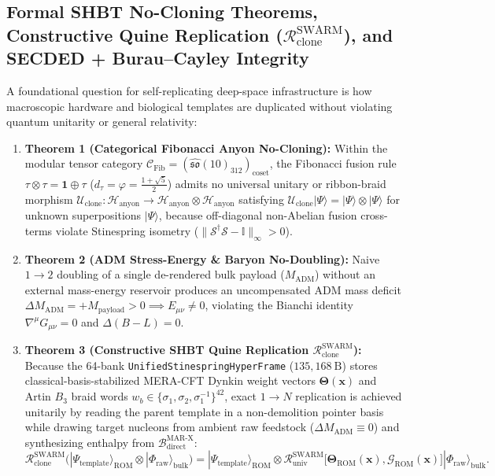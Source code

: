 \documentclass[11pt,onecolumn]{article}
\begin{document}
\FloatBarrier
\subsection[Formal SHBT No-Cloning Theorems and Constructive Quine Replication]{Formal SHBT No-Cloning Theorems, Constructive Quine Replication (\texorpdfstring{$\mathcal{R}_{\text{clone}}^{\text{SWARM}}$}{R(clone)}), and SECDED + Burau--Cayley Integrity}
\label{subsec:quine_cloning}
A foundational question for self-replicating deep-space infrastructure is how macroscopic hardware and biological templates are duplicated without violating quantum unitarity or general relativity:
\begin{enumerate}
    \item \textbf{Theorem 1 (Categorical Fibonacci Anyon No-Cloning):} Within the modular tensor category $\mathcal{C}_{\text{Fib}} = (\widehat{\mathfrak{so}}(10)_{312})_{\text{coset}}$, the Fibonacci fusion rule $\tau \otimes \tau = \mathbf{1} \oplus \tau$ ($d_\tau = \varphi = \frac{1+\sqrt{5}}{2}$) admits no universal unitary or ribbon-braid morphism $\mathcal{U}_{\text{clone}} : \mathcal{H}_{\text{anyon}} \to \mathcal{H}_{\text{anyon}} \otimes \mathcal{H}_{\text{anyon}}$ satisfying $\mathcal{U}_{\text{clone}}|\Psi\rangle = |\Psi\rangle \otimes |\Psi\rangle$ for unknown superpositions $|\Psi\rangle$, because off-diagonal non-Abelian fusion cross-terms violate Stinespring isometry ($\|\mathcal{S}^\dagger\mathcal{S} - \mathbb{I}\|_\infty > 0$).
    \item \textbf{Theorem 2 (ADM Stress-Energy \& Baryon No-Doubling):} Naive $1 \to 2$ doubling of a single de-rendered bulk payload ($M_{\text{ADM}}$) without an external mass-energy reservoir produces an uncompensated ADM mass deficit $\Delta M_{\text{ADM}} = +M_{\text{payload}} > 0 \implies E_{\mu\nu} \neq 0$, violating the Bianchi identity $\nabla^\mu G_{\mu\nu} = 0$ and $\Delta(B-L) = 0$.
    \item \textbf{Theorem 3 (Constructive SHBT Quine Replication $\mathcal{R}_{\text{clone}}^{\text{SWARM}}$):} Because the 64-bank \texttt{UnifiedStinespringHyperFrame} ($135{,}168~\text{B}$) stores classical-basis-stabilized MERA-CFT Dynkin weight vectors $\bm{\Theta}(\mathbf{x})$ and Artin $B_3$ braid words $w_b \in \{\sigma_1, \sigma_2, \sigma_1^{-1}\}^{42}$, exact $1 \to N$ replication is achieved unitarily by reading the parent template in a non-demolition pointer basis while drawing target nucleons from ambient raw feedstock ($\Delta M_{\text{ADM}} \equiv 0$) and synthesizing enthalpy from $\mathcal{B}_{\text{direct}}^{\text{MAR-X}}$:
    \begin{equation}
    \mathcal{R}_{\text{clone}}^{\text{SWARM}}\Big(|\Psi_{\text{template}}\rangle_{\text{ROM}} \otimes |\Phi_{\text{raw}}\rangle_{\text{bulk}}\Big) = |\Psi_{\text{template}}\rangle_{\text{ROM}} \otimes \mathcal{R}_{\text{univ}}^{\text{SWARM}}\big[\bm{\Theta}_{\text{ROM}}(\mathbf{x}), \mathcal{G}_{\text{ROM}}(\mathbf{x})\big]|\Phi_{\text{raw}}\rangle_{\text{bulk}}.
    \label{eq:r_clone_swarm}
    \end{equation}
\end{enumerate}
\end{document}
